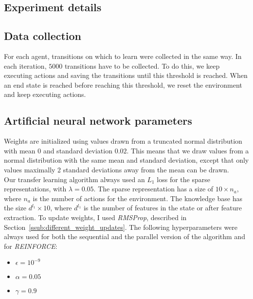 \begin{appendices}
\chapter{Experiment details}
\section{Data collection} %
\label{sec:data_collection}
For each agent, transitions on which to learn were collected in the same way. In each iteration, $5000$ transitions have to be collected. To do this, we keep executing actions and saving the transitions until this threshold is reached. When an end state is reached before reaching this threshold, we reset the environment and keep executing actions.
\section{Artificial neural network parameters} %
\label{sec:artificial_neural_network_parameters}
Weights are initialized using values drawn from a truncated normal distribution with mean $0$ and standard deviation $0.02$.
This means that we draw values from a normal distribution with the same mean and standard deviation, except that only values maximally 2 standard deviations away from the mean can be drawn.\\
Our transfer learning algorithm always used an $L_1$ loss for the sparse representations, with $\lambda = 0.05$.
The sparse representation has a size of $10 \times n_a$, where $n_a$ is the number of actions for the environment. The knowledge base has the size $d^{l_1}  \times 10$, where $d^{l_1}$ is the number of features in the state or after feature extraction.
To update weights, I used \textit{RMSProp}, described in Section~\ref{ssub:different_weight_updates}.
The following hyperparameters were always used for both the sequential and the parallel version of the algorithm and for \textit{REINFORCE}:
\begin{itemize}
    \item $\epsilon = 10^{-9}$
    \item $\alpha = 0.05$
    \item $\gamma = 0.9$
\end{itemize}


\end{appendices}
